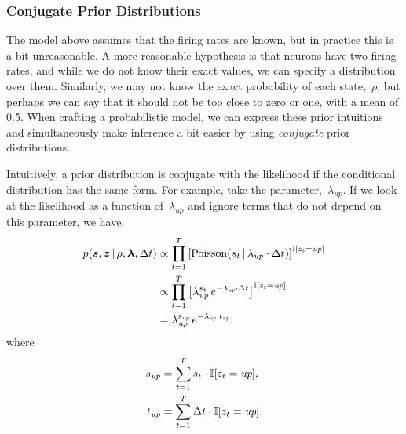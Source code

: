 \subsubsection{Conjugate Prior Distributions}
The model above assumes that the firing rates are known, but in practice 
this is a bit unreasonable. A more reasonable hypothesis is that neurons have 
two firing rates, and while we do not know their exact values, we can 
specify a distribution over them. Similarly, we may not know 
the exact probability of each state,~$\rho$, but perhaps we can say
that it should not be too close to zero or one, with a mean of 0.5.
When crafting a probabilistic model, we can express these prior
intuitions and simultaneously make inference a bit easier by using
\emph{conjugate} prior distributions.


Intuitively, a prior distribution is conjugate with the likelihood
if the conditional distribution has the same form. For example,
take the parameter,~$\lambda_{\textit{up}}$. If we look at the
likelihood as a function of~$\lambda_{\textit{up}}$ and ignore
terms that do not depend on this parameter, we have,
\begin{align}
  p(\boldsymbol{s}, \boldsymbol{z} \,|\, \rho, \boldsymbol{\lambda}, \Delta t)
  &\propto \prod_{t=1}^T \left[
    \mathrm{Poisson}(s_t \,|\, \lambda_{\textit{up}} \cdot \Delta t)
    \right]^{\mathbb{I}[z_t = \textit{up}]} \\
  &\propto \prod_{t=1}^T \left[
    \lambda_{\textit{up}}^{s_t} \,
    e^{-\lambda_{\textit{up}} \cdot \Delta t}
    \right]^{\mathbb{I}[z_t = \textit{up}]} \\
  &=
  \lambda_{\textit{up}}^{s_{\textit{up}}} \,
  e^{-\lambda_{\textit{up}} \cdot t_{\textit{up}}},
\end{align}
where
\begin{align}
  s_{\textit{up}} &= \sum_{t=1}^T s_t \cdot \mathbb{I}[z_t = \textit{up}], \\
  t_{\textit{up}} &= \sum_{t=1}^T \Delta t \cdot \mathbb{I}[z_t = \textit{up}].
\end{align}

